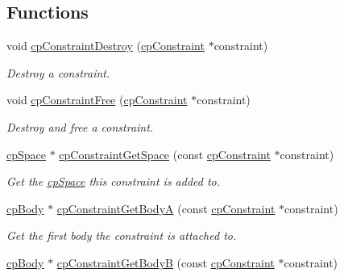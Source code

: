 \subsection*{Functions}
\begin{DoxyCompactItemize}
\item 
\hypertarget{group__cp_constraint_ga2c5c4d73886727485cb4d8c3e3ba1c15}{}void \hyperlink{group__cp_constraint_ga2c5c4d73886727485cb4d8c3e3ba1c15}{cp\+Constraint\+Destroy} (\hyperlink{structcp_constraint}{cp\+Constraint} $\ast$constraint)\label{group__cp_constraint_ga2c5c4d73886727485cb4d8c3e3ba1c15}

\begin{DoxyCompactList}\small\item\em Destroy a constraint. \end{DoxyCompactList}\item 
\hypertarget{group__cp_constraint_ga396e66d86ca72615ed681dfed3673a6c}{}void \hyperlink{group__cp_constraint_ga396e66d86ca72615ed681dfed3673a6c}{cp\+Constraint\+Free} (\hyperlink{structcp_constraint}{cp\+Constraint} $\ast$constraint)\label{group__cp_constraint_ga396e66d86ca72615ed681dfed3673a6c}

\begin{DoxyCompactList}\small\item\em Destroy and free a constraint. \end{DoxyCompactList}\item 
\hypertarget{group__cp_constraint_gad61f8b14aafae45187be794fcf39b9b0}{}\hyperlink{structcp_space}{cp\+Space} $\ast$ \hyperlink{group__cp_constraint_gad61f8b14aafae45187be794fcf39b9b0}{cp\+Constraint\+Get\+Space} (const \hyperlink{structcp_constraint}{cp\+Constraint} $\ast$constraint)\label{group__cp_constraint_gad61f8b14aafae45187be794fcf39b9b0}

\begin{DoxyCompactList}\small\item\em Get the \hyperlink{structcp_space}{cp\+Space} this constraint is added to. \end{DoxyCompactList}\item 
\hypertarget{group__cp_constraint_ga57beaffb8d2c54086f714f994f8e7bb5}{}\hyperlink{structcp_body}{cp\+Body} $\ast$ \hyperlink{group__cp_constraint_ga57beaffb8d2c54086f714f994f8e7bb5}{cp\+Constraint\+Get\+Body\+A} (const \hyperlink{structcp_constraint}{cp\+Constraint} $\ast$constraint)\label{group__cp_constraint_ga57beaffb8d2c54086f714f994f8e7bb5}

\begin{DoxyCompactList}\small\item\em Get the first body the constraint is attached to. \end{DoxyCompactList}\item 
\hypertarget{group__cp_constraint_ga29de279f6066523f2b9e44a12532f898}{}\hyperlink{structcp_body}{cp\+Body} $\ast$ \hyperlink{group__cp_constraint_ga29de279f6066523f2b9e44a12532f898}{cp\+Constraint\+Get\+Body\+B} (const \hyperlink{structcp_constraint}{cp\+Constraint} $\ast$constraint)\label{group__cp_constraint_ga29de279f6066523f2b9e44a12532f898}


\end{DoxyCompactItemize}

